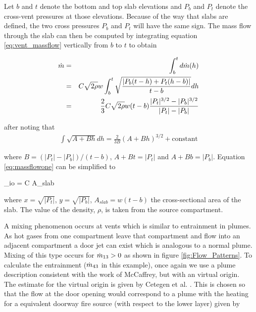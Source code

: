 Let $b$ and $t$ denote the bottom and top slab elevations and $P_b$ and $P_t$
denote the cross-vent pressures at those elevations.  Because of the way that
slabs are defined, the two cross pressures $P_b$ and $P_t$ will have the same sign.
The mass flow through the slab can then be computed by integrating equation \ref{eq:vent_massflow} vertically from $b$ to $t$ to obtain

\begin{eqnarray}
\dot{m}&=&\int_b^t d\dot{m}(h)\\
&=&C\sqrt{2\rho}w\int_b^t\sqrt{\frac{|P_b(t-h)+P_t(h-b)|}{t-b}}dh\\
&=&\frac{2}{3}C\sqrt{2\rho}w(t-b)\frac{|P_t|^{3/2}-|P_b|^{3/2}}{|P_t|-|P_b|}
\label{eq:massflowone}
\end{eqnarray}

\noindent after noting that
\begin{eqnarray*}
\int \sqrt{A+Bh}dh=\frac{2}{3B}(A+Bh)^{3/2}+\mbox{constant}
\end{eqnarray*}

\noindent where $B=(|P_t|-|P_b|)/(t-b)$, $A+Bt=|P_t|$ and $A+Bb=|P_b|$.
Equation \ref{eq:massflowone} can be simplified to

\be \dm_{io} =  C \sqrt{2 \rho} A_{slab}  \ee

\noindent where $x = \sqrt{|P_t|}$, $y = \sqrt{|P_b|}$, $A_{slab}=w(t-b)$ the cross-sectional area of the slab.  The value of the density, $\rho$, is taken from the source compartment.

A mixing phenomenon occurs at vents which is similar to entrainment in plumes.  As hot gases from one compartment leave that compartment and flow into an adjacent compartment a door jet can exist which is analogous to a normal plume.  Mixing of this type occurs for $\dot{m}_{13} > 0$ as shown in figure \ref{fig:Flow_Patterns}.  To calculate the entrainment ($\dot{m}_{43}$ in this example), once again we use a plume description consistent with the work of McCaffrey, but with an virtual origin.  The estimate for the virtual origin is given by Cetegen et al. \cite{Cetegen:1984}.  This  is chosen so that the flow at the door opening would correspond to a plume with the heating for a equivalent doorway fire source (with respect to the lower layer) given by

